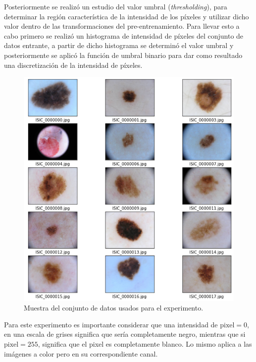 Posteriormente se realizó un estudio del valor umbral (\emph{thresholding}), para determinar la región característica de la intensidad de los píxeles y utilizar dicho valor dentro de las transformaciones del pre-entrenamiento. Para llevar esto a cabo primero se realizó un histograma de intensidad de píxeles del conjunto de datos entrante, a partir de dicho histograma se determinó el valor umbral y posteriormente se aplicó la función de umbral binario para dar como resultado una discretización de la intensidad de píxeles.
\begin{figure}[]
    \centering
    \includegraphics[scale=0.7]{../Plots/Images_input.png}
    \caption{Muestra del conjunto de datos usados para el experimento.}
    \label{fig:img_in}    
\end{figure}

Para este experimento es importante considerar que una intensidad de $\text{pixel} = 0$, en una escala de grises significa que sería completamente negro, mientras que si $\text{pixel} = 255$, significa que el pixel es completamente blanco. Lo mismo aplica a las imágenes a color pero en su correspondiente canal. 

